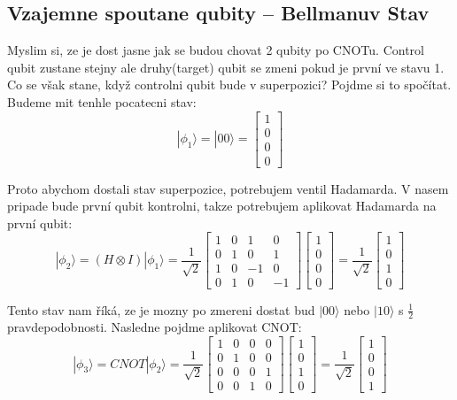 \documentclass[11pt]{article}
\begin{document}
\subsection{Vzajemne spoutane qubity – Bellmanuv Stav}
Myslim si, ze je dost jasne jak se budou chovat 2 qubity po CNOTu.
Control qubit zustane stejny ale druhy(target) qubit se zmeni pokud je první ve stavu 1.
Co se však stane, když controlni qubit bude v superpozici? Pojdme si to spočítat.
Budeme mit tenhle pocatecni stav:
$$|\phi_1 \rangle = |00\rangle = \begin{bmatrix}
        1 \\
        0 \\
        0 \\
        0
    \end{bmatrix}$$
\par Proto abychom dostali stav superpozice, potrebujem ventil Hadamarda.
V nasem pripade bude první qubit kontrolni, takze potrebujem aplikovat Hadamarda na první qubit:
$$|\phi_2 \rangle = (H \otimes I) |\phi_1 \rangle = \frac{1}{\sqrt{2}} \begin{bmatrix}
        1 & 0 & 1  & 0  \\
        0 & 1 & 0  & 1  \\
        1 & 0 & -1 & 0  \\
        0 & 1 & 0  & -1
    \end{bmatrix}\begin{bmatrix}
        1 \\
        0 \\
        0 \\
        0
    \end{bmatrix} = \frac{1}{\sqrt{2}}\begin{bmatrix}
        1 \\
        0 \\
        1 \\
        0
    \end{bmatrix}$$
\par Tento stav nam říká, ze je mozny po zmereni dostat bud $|00\rangle$ nebo $|10\rangle$ s $\frac{1}{2}$ pravdepodobnosti.
Nasledne pojdme aplikovat CNOT:
$$|\phi_3 \rangle = CNOT |\phi_2 \rangle = \frac{1}{\sqrt{2}} \begin{bmatrix}
        1 & 0 & 0 & 0 \\
        0 & 1 & 0 & 0 \\
        0 & 0 & 0 & 1 \\
        0 & 0 & 1 & 0
    \end{bmatrix}\begin{bmatrix}
        1 \\
        0 \\
        1 \\
        0
    \end{bmatrix} = \frac{1}{\sqrt{2}}\begin{bmatrix}
        1 \\
        0 \\
        0 \\
        1
    \end{bmatrix}$$
\end{document}
